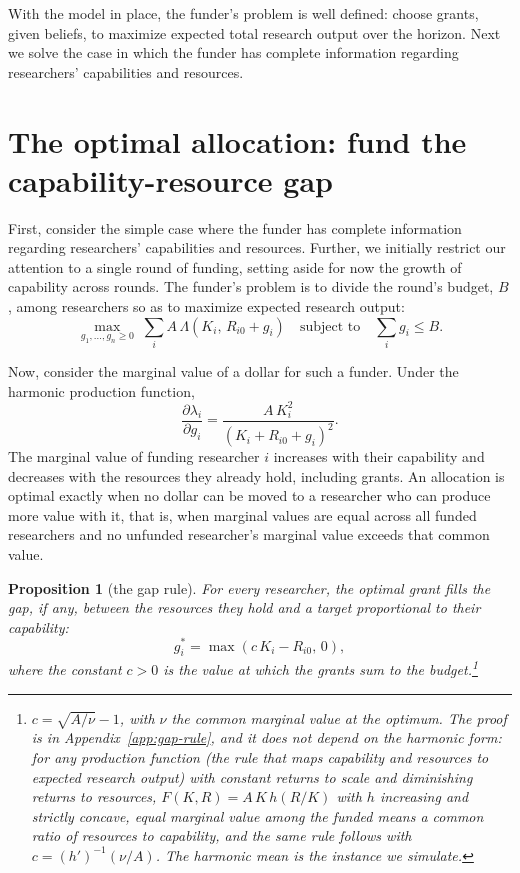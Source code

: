 \documentclass[article, 11pt, reqno]{amsart}
\newtheorem{prop}{Proposition}
\theoremstyle{named}
\begin{document}
With the model in place, the funder's problem is well defined: choose grants, given beliefs, to maximize expected total research output over the horizon. Next we solve the case in which the funder has complete information regarding researchers' capabilities and resources.


\section{The optimal allocation: fund the capability-resource gap}\label{sec:optimal}

First, consider the simple case where the funder has complete information regarding researchers' capabilities and resources. Further, we initially restrict our attention to a single round of funding, setting aside for now the growth of capability across rounds. The funder's problem is to divide the round's budget, $B$, among researchers so as to maximize expected research output:
\[
\max_{g_1, \ldots, g_n \geq 0} \; \sum_{i} A\,\Lambda(K_i,\, R_{i0} + g_i) \quad \text{subject to} \quad \sum_{i} g_i \leq B.
\]

Now, consider the marginal value of a dollar for such a funder. Under the harmonic production function,
\[
\frac{\partial \lambda_i}{\partial g_i} = \frac{A\,K_i^2}{(K_i + R_{i0} + g_i)^2}.
\]
The marginal value of funding researcher $i$ increases with their capability and decreases with the resources they already hold, including grants. An allocation is optimal exactly when no dollar can be moved to a researcher who can produce more value with it, that is, when marginal values are equal across all funded researchers and no unfunded researcher's marginal value exceeds that common value.

\begin{prop}[the gap rule]\label{prop:gap-rule}
For every researcher, the optimal grant fills the gap, if any, between the resources they hold and a target proportional to their capability:
\[
g_i^* = \max(c\,K_i - R_{i0},\, 0),
\]
where the constant $c > 0$ is the value at which the grants sum to the budget.\footnote{$c = \sqrt{A/\nu} - 1$, with $\nu$ the common marginal value at the optimum. The proof is in Appendix~\ref{app:gap-rule}, and it does not depend on the harmonic form: for any production function (the rule that maps capability and resources to expected research output) with constant returns to scale and diminishing returns to resources, $F(K, R) = A\,K\,h(R/K)$ with $h$ increasing and strictly concave, equal marginal value among the funded means a common ratio of resources to capability, and the same rule follows with $c = (h')^{-1}(\nu/A)$. The harmonic mean is the instance we simulate.}
\end{prop}
\end{document}
